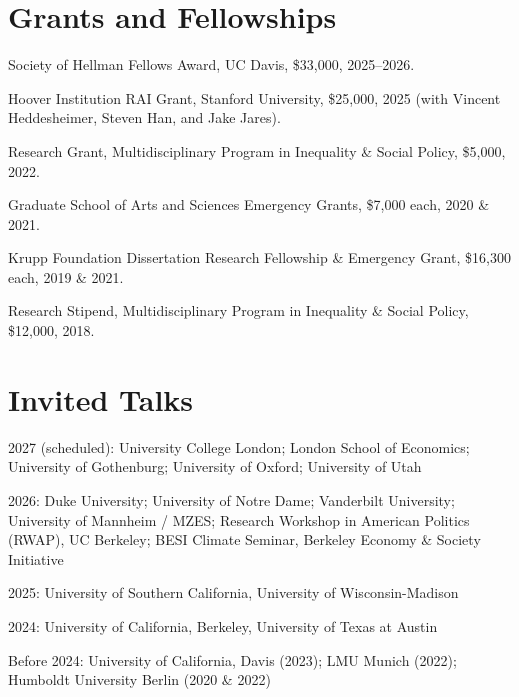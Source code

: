 \documentclass[letterpaper, 10pt]{article}
\newif\ifjobmarket
\renewenvironment{itemize}{
  \begin{list}{}{
    \setlength{\leftmargin}{0em}
  }
}{
  \end{list}
}
\begin{document}
\section*{Grants and Fellowships}
\begin{itemize}
  \item Society of Hellman Fellows Award, UC Davis, \$33,000, 2025--2026.
  \item Hoover Institution RAI Grant, Stanford University, \$25,000, 2025 (with Vincent Heddesheimer, Steven Han, and Jake Jares).
  \ifjobmarket
  \item Academic Senate Committee on Research Small Grants, UC Davis, \$2,000 each, 2024 and 2025.
  \fi
  \item Research Grant, Multidisciplinary Program in Inequality \& Social Policy, \$5,000, 2022.
  \ifjobmarket
  \item Harvard Mellon Urban Initiative Grant, \$1,900, 2022.
  \fi
  \item Graduate School of Arts and Sciences Emergency Grants, \$7,000 each, 2020 \& 2021.
  \item Krupp Foundation Dissertation Research Fellowship \& Emergency Grant, \$16,300 each, 2019 \& 2021.
  \item Research Stipend, Multidisciplinary Program in Inequality \& Social Policy, \$12,000, 2018.
  \ifjobmarket
  \item Institute for Quantitative Social Science Research Grant, \$2,800 each, 2018 \& 2020.
  \item Harvard Center for American Political Studies Seed Grant, \$1,500 each, 2017 \& 2022 (with Jacob R. Brown).
  \fi
\end{itemize}

\vspace*{-0.1cm}
\section*{Invited Talks}

\begin{itemize}
  \item 2027 (scheduled): University College London; London School of Economics; University of Gothenburg; University of Oxford; University of Utah
  \item 2026: Duke University; University of Notre Dame; Vanderbilt University; University of Mannheim / MZES; Research Workshop in American Politics (RWAP), UC Berkeley; BESI Climate Seminar, Berkeley Economy \& Society Initiative
  \item 2025: University of Southern California, University of Wisconsin-Madison
  \item 2024: University of California, Berkeley, University of Texas at Austin
  \item Before 2024: University of California, Davis (2023); LMU Munich (2022); Humboldt University Berlin (2020 \& 2022)
\end{itemize}
\end{document}
